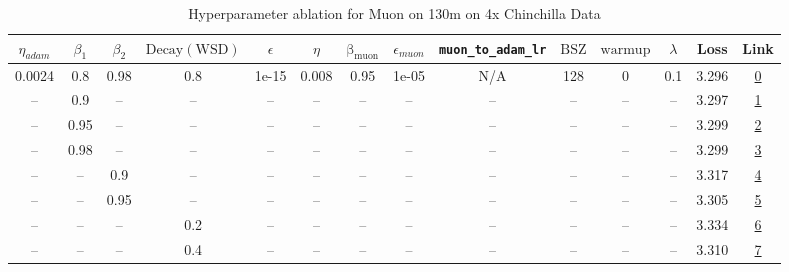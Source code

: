 \begin{table}[H]
\centering
\caption{Hyperparameter ablation for Muon on 130m on 4x Chinchilla Data}
\label{tab:ablation_muon_130m_4}
\begin{tabular}{cccccccccccccc}
\toprule
$\eta_{adam}$ & $\beta_1$ & $\beta_2$ & $\mathrm{Decay (WSD)}$ & $\epsilon$ & $\eta$ & $\mathrm{\beta_{muon}}$ & $\epsilon_{muon}$ & \texttt{muon\_to\_adam\_lr} & $\mathrm{BSZ}$ & $\mathrm{warmup}$ & $\lambda$ & Loss & Link \\
\midrule
0.0024 & 0.8 & 0.98 & 0.8 & 1e-15 & 0.008 & 0.95 & 1e-05 & N/A & 128 & 0 & 0.1 & 3.296 & \href{https://wandb.ai/stanford-mercury/optimizer-scaling/runs/sweep-130m-10B-muonz43402blr0.008-wd0.1-minlr0-warmup0-b10.8-b20-82a88f}{0} \\
\midrule
-- & 0.9 & -- & -- & -- & -- & -- & -- & -- & -- & -- & -- & 3.297 & \href{https://wandb.ai/stanford-mercury/optimizer-scaling/runs/sweep-130m-10B-muonzbb0111lr0.008-wd0.1-minlr0-warmup0-b10.9-b20-e90842}{1} \\
-- & 0.95 & -- & -- & -- & -- & -- & -- & -- & -- & -- & -- & 3.299 & \href{https://wandb.ai/stanford-mercury/optimizer-scaling/runs/sweep-130m-10B-muonz5e66d9lr0.008-wd0.1-minlr0-warmup0-b10.95-b2-52e19f}{2} \\
-- & 0.98 & -- & -- & -- & -- & -- & -- & -- & -- & -- & -- & 3.299 & \href{https://wandb.ai/stanford-mercury/optimizer-scaling/runs/sweep-130m-10B-muonz764f0blr0.008-wd0.1-minlr0-warmup0-b10.98-b2-60215f}{3} \\
-- & -- & 0.9 & -- & -- & -- & -- & -- & -- & -- & -- & -- & 3.317 & \href{https://wandb.ai/stanford-mercury/optimizer-scaling/runs/sweep-130m-10B-muonzdd254blr0.008-wd0.1-minlr0-warmup0-b10.8-b20-13830a}{4} \\
-- & -- & 0.95 & -- & -- & -- & -- & -- & -- & -- & -- & -- & 3.305 & \href{https://wandb.ai/stanford-mercury/optimizer-scaling/runs/sweep-130m-10B-muonza8c09blr0.008-wd0.1-minlr0-warmup0-b10.8-b20-9004a0}{5} \\
-- & -- & -- & 0.2 & -- & -- & -- & -- & -- & -- & -- & -- & 3.334 & \href{https://wandb.ai/stanford-mercury/optimizer-scaling/runs/sweep-130m-10B-muonz92cf4alr0.008-wd0.1-minlr0-warmup0-b10.8-b20-bdd74a}{6} \\
-- & -- & -- & 0.4 & -- & -- & -- & -- & -- & -- & -- & -- & 3.310 & \href{https://wandb.ai/stanford-mercury/optimizer-scaling/runs/sweep-130m-10B-muonz252576lr0.008-wd0.1-minlr0-warmup0-b10.8-b20-5f8e54}{7} \\

\end{tabular}
\end{table}
